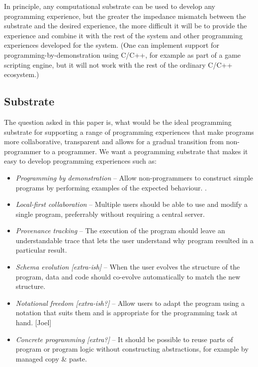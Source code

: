 \documentclass[sigconf]{acmart}
\begin{document}
In principle, any computational substrate can be used to develop any programming experience,
but the greater the impedance mismatch between the substrate and the desired experience,
the more difficult it will be to provide the experience and combine it with the rest of the
system and other programming experiences developed for the system. (One can implement support
for programming-by-demonstration using C/C++, for example as part of a game scripting engine,
but it will not work with the rest of the ordinary C/C++ ecosystem.)

\subsection{Substrate}

The question asked in this paper is, what would be the ideal programming substrate
for supporting a range of programming experiences that make programs more
collaborative, transparent and allows for a gradual transition from non-programmer
to a programmer. We want a programming substrate that makes it easy to develop
programming experiences such as:

\begin{itemize}
\item \emph{Programming by demonstration} --
  Allow non-programmers to construct simple programs by performing examples of the expected behaviour. \cite{leiva-2021-rapido}.
\item \emph{Local-first collaboration} --
  Multiple users should be able to use and modify a single program, preferrably without requiring a central server. \cite{kleppmann-2019-local}
\item \emph{Provenance tracking} --
  The execution of the program should leave an understandable trace that lets the user understand why program resulted in a particular result.
\item \emph{Schema evolution [extra-ish]} --
  When the user evolves the structure of the program, data and code should co-evolve automatically to match the new structure.
\item \emph{Notational freedom [extra-ish?]} --
  Allow users to adapt the program using a notation that suits them and is appropriate for the programming task at hand. [Joel]
\item \emph{Concrete programming [extra?]} --
  It should be possible to reuse parts of program or program logic without constructing abstractions, for example by managed copy \& paste.\cite{edwards-2006-copypaste,edwards-2022-copypaste}
\end{itemize}
\end{document}
